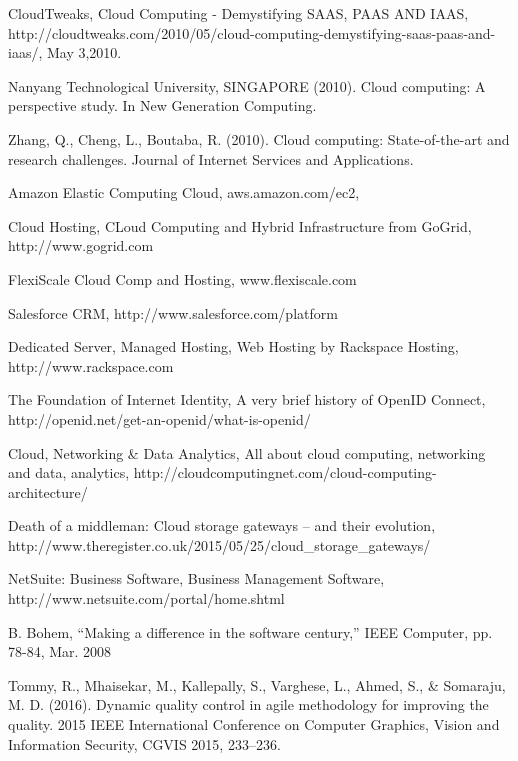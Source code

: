 \begin{thebibliography}{9}

  CloudTweaks,
  Cloud Computing - Demystifying SAAS, PAAS AND IAAS,
  http://cloudtweaks.com/2010/05/cloud-computing-demystifying-saas-paas-and-iaas/,
  May 3,2010.
  
Nanyang Technological University, SINGAPORE (2010). Cloud computing: A perspective study. In New Generation Computing. 

Zhang, Q., Cheng, L., Boutaba, R. (2010). Cloud computing: State-of-the-art and research challenges. Journal of Internet Services and Applications.


Amazon Elastic Computing Cloud, aws.amazon.com/ec2,

Cloud Hosting, CLoud Computing and Hybrid Infrastructure from GoGrid, http://www.gogrid.com

FlexiScale Cloud Comp and Hosting, www.flexiscale.com

Salesforce CRM, http://www.salesforce.com/platform

Dedicated Server, Managed Hosting, Web Hosting by Rackspace Hosting, http://www.rackspace.com

The Foundation of Internet Identity, A very brief history of OpenID Connect, http://openid.net/get-an-openid/what-is-openid/

Cloud, Networking \& Data Analytics,
All about cloud computing, networking and data, analytics, http://cloudcomputingnet.com/cloud-computing-architecture/

Death of a middleman: Cloud storage gateways – and their evolution, http://www.theregister.co.uk/2015/05/25/cloud\_storage\_gateways/

NetSuite: Business Software, Business Management Software, http://www.netsuite.com/portal/home.shtml

 B. Bohem, “Making a difference in the software century,” IEEE Computer, pp. 78-84, Mar. 2008
 
Tommy, R., Mhaisekar, M., Kallepally, S., Varghese, L., Ahmed, S., \& Somaraju, M. D. (2016). Dynamic quality control in agile methodology for improving the quality. 2015 IEEE International Conference on Computer Graphics, Vision and Information Security, CGVIS 2015, 233–236.


\end{thebibliography}
